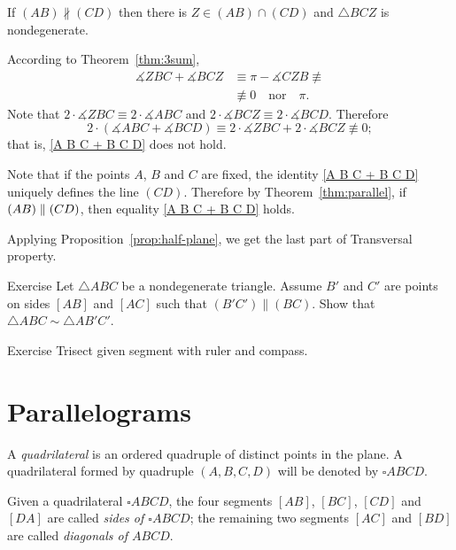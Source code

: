 If $(AB)\nparallel(C D)$
then there is $Z\in (AB)\cap(C D)$ 
and $\triangle BCZ$ is nondegenerate.

According to Theorem~\ref{thm:3sum}, 
\begin{align*}
\measuredangle ZBC+\measuredangle BCZ&\equiv \pi-\measuredangle CZB\not\equiv 
\\&\not\equiv 0
\quad
\text{nor}
\quad
\pi.
\end{align*}
Note that $2\cdot\measuredangle Z B C\equiv 2\cdot\measuredangle A B C$ and $2\cdot\measuredangle B C Z\equiv2\cdot\measuredangle B C D$.
Therefore 
$$2\cdot(\measuredangle A B C+\measuredangle B C D)\equiv 2\cdot\measuredangle Z B C +2\cdot\measuredangle B C Z\not\equiv 0;$$
that is, \ref{A B C + B C D} does not hold.

Note that if the points $A$, $B$ and $C$ are fixed,
the identity \ref{A B C + B C D} uniquely defines the line $(C D)$.
Therefore by Theorem~\ref{thm:parallel}, 
if $(AB)\z\parallel(C D)$, then equality \ref{A B C + B C D} holds.

Applying Proposition~\ref{prop:half-plane},
we get the last part of Transversal property.
\qeds


\begin{thm}{Exercise}\label{ex:smililar+parallel}
Let $\triangle ABC$ be a nondegenerate triangle.
Assume $B'$ and $C'$ are points on sides $[AB]$ and $[AC]$ such that $(B'C')\parallel(BC)$.
Show that $\triangle ABC\sim\triangle AB'C'$.
\end{thm}

\begin{thm}{Exercise}\label{ex:trisection}
Trisect given segment with ruler and compass.
\end{thm}





\section*{Parallelograms}

A \emph{quadrilateral} is an ordered quadruple of distinct points in the plane.
A quadrilateral formed by quadruple $(A,B,C,D)$ will be denoted by $\square ABCD$.

Given a quadrilateral $\square ABCD$,
the four segments $[AB]$, $[BC]$, $[CD]$ and $[DA]$ are called \emph{sides of $\square ABCD$};
the remaining two segments $[AC]$ and $[BD]$ are called \emph{diagonals of $ABCD$}.


